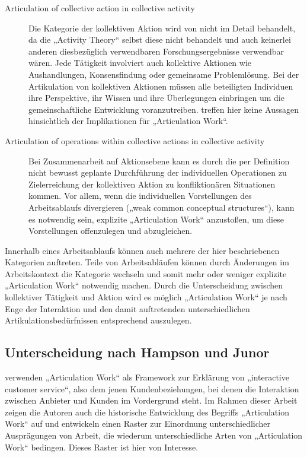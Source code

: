 \begin{description}
	\item[Articulation of collective action in collective activity] Die Kategorie der kollektiven Aktion wird von \citep{Fjuk97} nicht im Detail behandelt, da die „Activity Theory“ selbst diese nicht behandelt und auch keinerlei anderen diesbezüglich verwendbaren Forschungsergebnisse verwendbar wären. Jede Tätigkeit involviert auch kollektive Aktionen wie Aushandlungen, Konsensfindung oder gemeinsame Problemlösung. Bei der Artikulation von kollektiven Aktionen müssen alle beteiligten Individuen ihre Perspektive, ihr Wissen und ihre Überlegungen einbringen um die gemeinschaftliche Entwicklung voranzutreiben. \citet{Fjuk97} treffen hier keine Aussagen hinsichtlich der Implikationen für „Articulation Work“.
	\item[Articulation of operations within collective actions in collective activity] Bei Zusammenarbeit auf Aktionsebene kann es durch die per Definition nicht bewusst geplante Durchführung der individuellen Operationen zu Zielerreichung der kollektiven Aktion zu konfliktionären Situationen kommen. Vor allem, wenn die individuellen Vorstellungen des Arbeitsablaufs divergieren („weak common conceptual structures“), kann es notwendig sein, explizite „Articulation Work“ anzustoßen, um diese Vorstellungen offenzulegen und abzugleichen.
\end{description}

Innerhalb eines Arbeitsablaufs können auch mehrere der hier beschriebenen Kategorien auftreten. Teile von Arbeitsabläufen können durch Änderungen im Arbeitskontext die Kategorie wechseln und somit mehr oder weniger explizite „Articulation Work“ notwendig machen. Durch die Unterscheidung zwischen kollektiver Tätigkeit und Aktion wird es möglich „Articulation Work“ je nach Enge der Interaktion und den damit auftretenden unterschiedlichen Artikulationsbedürfnissen entsprechend auszulegen.

\subsection{Unterscheidung nach Hampson und Junor}
\label{sub:arten_hampson}

\citep{Hampson05} verwenden „Articulation Work“ als Framework zur Erklärung von „interactive customer service“, also dem jenen Kundenbeziehungen, bei denen die Interaktion zwischen Anbieter und Kunden im Vordergrund steht. Im Rahmen dieser Arbeit zeigen die Autoren auch die historische Entwicklung des Begriffs „Articulation Work“ auf und entwickeln einen Raster zur Einordnung unterschiedlicher Ausprägungen von Arbeit, die wiederum unterschiedliche Arten von „Articulation Work“ bedingen. Dieses Raster ist hier von Interesse.

